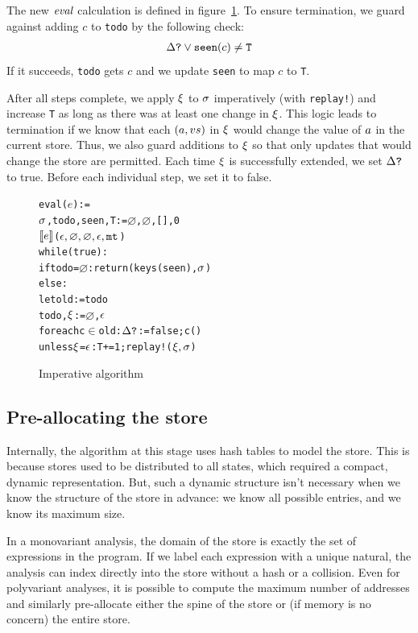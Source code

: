 \documentclass[preprint,onecolumn,9pt]{sigplanconf} %
\begin{document}
The new $\mathit{eval}$ calculation is defined in
figure~\ref{fig:imperative}.  To ensure termination, we guard against adding
$c$ to {\tt todo} by the following check:
\begin{align*}\Delta\mbox{{\tt ?}} \vee {\tt seen}(c) \neq {\tt T}\end{align*}
If it succeeds, {\tt todo} gets $c$ and we update {\tt seen} to map $c$ to {\tt T}.

After all steps complete, we apply $\xi$ to $\sigma$ imperatively
(with {\tt replay!}) and increase {\tt T} as long as there was at
least one change in $\xi$. This logic leads to termination if we
know that each $(a, v{s})$ in $\xi$ would change
the value of $a$ in the current store. Thus, we also guard
additions to $\xi$ so that only updates that would change the
store are permitted. Each time $\xi$ is successfully extended, we
set $\Delta\mbox{{\tt ?}}$ to true. Before each individual step, we set it
to false.

\begin{figure}
\begin{alltt}
eval(\(e\)) :=
  \(\msto\), todo, seen, T := \(\varnothing\), \(\varnothing\), [], 0
  \(\compile{e}\)(\(\mtcntr, \varnothing, \varnothing, \mtlst, \kmt\))
  while(true):
    if todo = \(\varnothing\): return (keys(seen), \(\msto\))
    else:
      let old := todo
      todo, \(\msdiff\) := \(\varnothing\), \(\mtlst\)
      foreach c \(\in\) old: \(\changep\) := false; c()
      unless \(\msdiff\) = \(\mtlst\): T += 1; replay!(\(\msdiff, \msto\))
\end{alltt}
\caption{Imperative algorithm}
\label{fig:imperative}
\end{figure}

\subsection{Pre-allocating the store}

Internally, the algorithm at this stage uses hash tables to model the store.
%
This is because stores used to be distributed to all states, which
required a compact, dynamic representation.
%
But, such a dynamic structure isn't necessary when we know the
structure of the store in advance: we know all possible entries, and
we know its maximum size.

In a monovariant analysis, the domain of the store is
exactly the set of expressions in the program.
%
If we label each expression with a unique natural, the analysis can
index directly into the store without a hash or a collision.
%
Even for polyvariant analyses, it is possible to compute the maximum
number of addresses and similarly pre-allocate either the spine of the
store or (if memory is no concern) the entire store.
\end{document}
